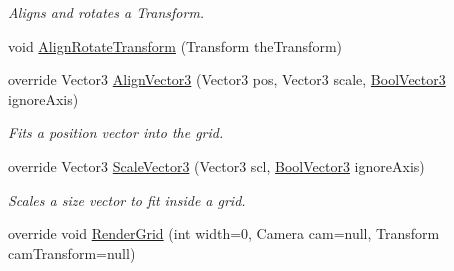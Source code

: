 \begin{DoxyCompactItemize}
\begin{DoxyCompactList}\small\item\em Aligns and rotates a Transform.\end{DoxyCompactList}\item 
void \hyperlink{class_g_f_polar_grid_ad8054ff4516cc6929b110de4c2b0c77c_ad8054ff4516cc6929b110de4c2b0c77c}{Align\+Rotate\+Transform} (Transform the\+Transform)
\item 
override Vector3 \hyperlink{class_g_f_polar_grid_a5faa2b607e1ffc4ad2d3d5e7d62bf611_a5faa2b607e1ffc4ad2d3d5e7d62bf611}{Align\+Vector3} (Vector3 pos, Vector3 scale, \hyperlink{class_grid_framework_1_1_vectors_1_1_bool_vector3}{Bool\+Vector3} ignore\+Axis)
\begin{DoxyCompactList}\small\item\em Fits a position vector into the grid.\end{DoxyCompactList}\item 
override Vector3 \hyperlink{class_g_f_polar_grid_aa7d26ab4a4cfbe914001c7f635ee2ace_aa7d26ab4a4cfbe914001c7f635ee2ace}{Scale\+Vector3} (Vector3 scl, \hyperlink{class_grid_framework_1_1_vectors_1_1_bool_vector3}{Bool\+Vector3} ignore\+Axis)
\begin{DoxyCompactList}\small\item\em Scales a size vector to fit inside a grid.\end{DoxyCompactList}\item 
override void \hyperlink{class_g_f_polar_grid_a5c3dd0e599e358379dc7c83f31e1dc5f_a5c3dd0e599e358379dc7c83f31e1dc5f}{Render\+Grid} (int width=0, Camera cam=null, Transform cam\+Transform=null)
\end{DoxyCompactItemize}
